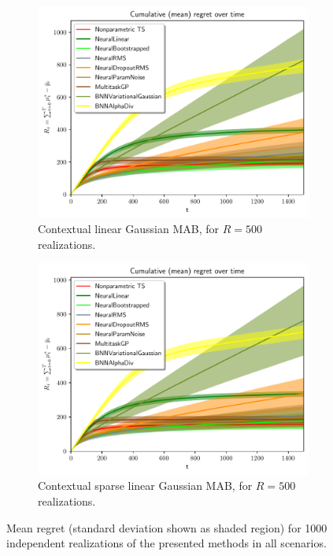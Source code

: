 \begin{figure}[!h]
	\centering
	\begin{subfigure}[c]{0.45\textwidth}
		\includegraphics[width=\textwidth]{./figs/linear_showdown_baselines/cum_optexpected_regret_std}
		\vspace*{-5ex}
		\caption{Contextual linear Gaussian MAB, for $R=500$ realizations.}
		\label{fig:linear_showdown_baselines}
	\end{subfigure}
	\qquad
	\begin{subfigure}[c]{0.45\textwidth}
		\includegraphics[width=\textwidth]{./figs/sparse_linear_showdown_baselines/cum_optexpected_regret_std}
		\vspace*{-5ex}
		\caption{Contextual sparse linear Gaussian MAB, for $R=500$ realizations.}
		\label{fig:sparse_linear_showdown_baselines}
	\end{subfigure}
	\vspace*{-2ex}
	\caption{Mean regret (standard deviation shown as shaded region) for 1000 independent realizations of the presented methods in all scenarios.}
	\label{fig:linear_gaussian_mixtures_baselines}
\end{figure}

